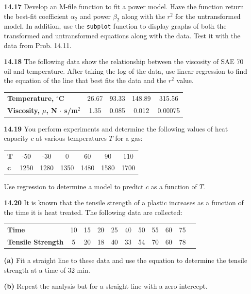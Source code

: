 \documentclass[../main.tex]{subfiles}
\begin{document}
\begin{multicols}{2}
	\noindent\textbf{14.17} Develop an M-file function to fit a power model.
	Have the function return the best-fit coefficient $\alpha_2$ and
	power $\beta_2$ along with the $r^2$ for the untransformed model. In
	addition, use the \texttt{subplot} function to display graphs of both
	the transformed and untransformed equations along with the
	data. Test it with the data from Prob. 14.11.

	\noindent\textbf{14.18} The following data show the relationship between the
	viscosity of SAE 70 oil and temperature. After taking the log
	of the data, use linear regression to find the equation of the
	line that best fits the data and the $r^2$ value.

	\noindent \begin{tabular}{l c c c c}
		\textbf{Temperature, $^\circ$C} & 26.67 & 93.33 & 148.89 & 315.56 \\
		\textbf{Viscosity, $\mu$, N $\cdot$ s/m$^2$} & 1.35 & 0.085 & 0.012 & 0.00075
  	\end{tabular}

	\noindent\textbf{14.19} You perform experiments and determine the following values of heat capacity $c$ at various temperatures $T$ for a gas:

	\noindent \begin{tabular}{l c c c c c c}
		\textbf{T} & -50 & -30 & 0 & 60 & 90 & 110 \\
		\textbf{c} & 1250 & 1280 & 1350 & 1480 & 1580 & 1700
  	\end{tabular}

	\noindent Use regression to determine a model to predict $c$ as a function of $T$.

	\noindent\textbf{14.20} It is known that the tensile strength of a plastic increases as a function of the time it is heat treated. The following data are collected:

	\noindent \begin{tabular}{l c c c c c c c c c c}
		\textbf{Time} & 10 & 15 & 20 & 25 & 40 & 50 & 55 & 60 & 75 \\
		\textbf{Tensile Strength} & 5 & 20 & 18 & 40 & 33 & 54 & 70 & 60 & 78
  	\end{tabular}

	\noindent \textbf{(a)} Fit a straight line to these data and use the equation to
	determine the tensile strength at a time of 32 min.


	\noindent \textbf{(b)} Repeat the analysis but for a straight line with a zero
	intercept.


\end{multicols}
\end{document}

